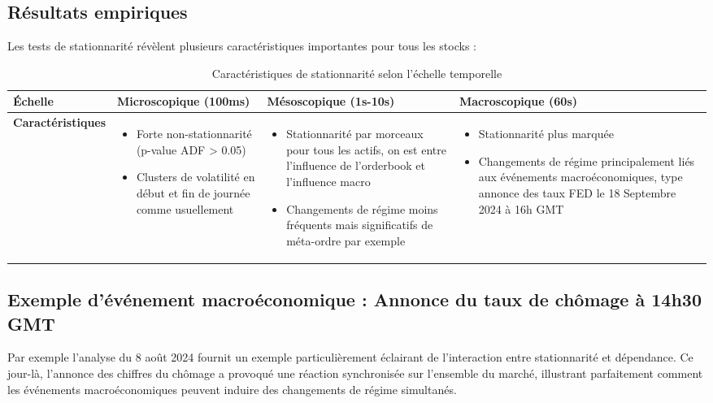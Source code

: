 \documentclass[10pt,a4paper]{article}
\theoremstyle{definition}
\theoremstyle{remark}
\begin{document}
\subsection{Résultats empiriques}

Les tests de stationnarité révèlent plusieurs caractéristiques importantes pour tous les stocks :


\begin{table}[h!]
\centering
\begin{tabular}{|p{2.5cm}|p{4cm}|p{4cm}|p{4cm}|}
\hline
\textbf{Échelle} & \textbf{Microscopique} (100ms) & \textbf{Mésoscopique} (1s-10s) & \textbf{Macroscopique} (60s) \\
\hline
\textbf{Caractéristiques} & 
\begin{itemize}
    \item Forte non-stationnarité (p-value ADF > 0.05)
    \item Clusters de volatilité en début et fin de journée comme usuellement
\end{itemize} &
\begin{itemize}
    \item Stationnarité par morceaux pour tous les actifs, on est entre l'influence de l'orderbook et l'influence macro
    \item Changements de régime moins fréquents mais significatifs de méta-ordre par exemple
\end{itemize} &
\begin{itemize}
    \item Stationnarité plus marquée
    \item Changements de régime principalement liés aux événements macroéconomiques, type annonce des taux FED le 18 Septembre 2024 à 16h GMT
\end{itemize} \\
\hline
\end{tabular}
\caption{Caractéristiques de stationnarité selon l'échelle temporelle}
\label{tab:stationarity_results}
\end{table}

\subsection{Exemple d'événement macroéconomique : Annonce du taux de chômage à 14h30 GMT}

Par exemple l'analyse du 8 août 2024 fournit un exemple particulièrement éclairant de l'interaction entre stationnarité et dépendance. Ce jour-là, l'annonce des chiffres du chômage a provoqué une réaction synchronisée sur l'ensemble du marché, illustrant parfaitement comment les événements macroéconomiques peuvent induire des changements de régime simultanés.
\end{document}
